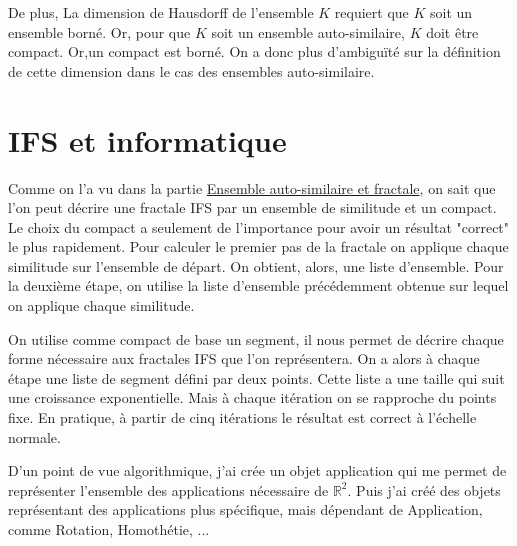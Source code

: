 \documentclass[a4paper, 12pt]{report}
\begin{document}
			De plus, La dimension de Hausdorff de l'ensemble $K$ requiert que $K$ soit un ensemble borné. Or, pour que $K$ soit un ensemble auto-similaire, $K$ doit être compact. Or,un compact est borné. On a donc plus d’ambiguïté sur la définition de cette dimension dans le cas des ensembles auto-similaire.
			
			
			
			
			
			
			
		
			
			
			
			
			
			
			
			
			
			
			
			
			
			
			
			
			
			
			
			
			
			
			
			
			
			
			
	
	\chapter{IFS et informatique}
			
			Comme on l'a vu dans la partie \hyperref[FracEns]{Ensemble auto-similaire et fractale}, on sait que l'on peut décrire une fractale IFS par un ensemble de similitude et un compact. 
			Le choix du compact a seulement de l'importance pour avoir un résultat "correct" le plus rapidement. Pour calculer le premier pas de la fractale on applique chaque similitude sur l'ensemble de départ. On obtient, alors, une liste d'ensemble. Pour la deuxième étape, on utilise la liste d'ensemble précédemment obtenue sur lequel on applique chaque similitude.
			
			
			\vspace{.2 cm}\hspace{.7 cm}
			On utilise comme compact de base un segment, il nous permet de décrire chaque forme nécessaire aux fractales IFS que l'on représentera. On a alors à chaque étape une liste de segment défini par deux points. Cette liste a une taille qui suit une croissance exponentielle. Mais à chaque itération on se rapproche du points fixe. En pratique, à partir de cinq itérations le résultat est correct à l'échelle normale.
			
			\vspace{.2 cm}\hspace{.7 cm}
			D'un point de vue algorithmique, j'ai crée un objet application qui me permet de représenter l'ensemble des applications nécessaire de $\mathds{R}^2$. Puis j'ai créé des objets représentant des applications plus spécifique, mais dépendant de Application, comme Rotation, Homothétie, ...
			
\end{document}
